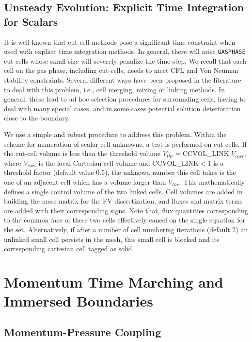 \subsection{Unsteady Evolution: Explicit Time Integration for Scalars} \label{sec:exscl}

It is well known that cut-cell methods pose a significant time constraint when used with explicit time integration methods.
In general, there will arise \texttt{GASPHASE} cut-cells whose small-size will severely penalize
the time step. We recall that each cell on the gas phase, including cut-cells, needs to meet CFL and Von Neuman stability constraints. Several different ways have been proposed in the literature to deal with this problem, i.e., cell merging, mixing or linking methods. In general, these lead to ad hoc selection procedures for surrounding cells, having to deal with many special cases, and in some cases potential solution deterioration close to the boundary.

We use a simple and robust procedure to address this problem. Within the scheme for numeration of scalar cell unknowns, a test is performed on cut-cells. If the cut-cell volume is less than the threshold volume $V_{thr}= ${\ct CCVOL\_LINK} $V_{cart}$, where $V_{cart}$ is the local Cartesian cell volume and {\ct CCVOL\_LINK}$<1$ is a threshold factor (default value 0.5), the unknown number this cell takes is the one of an adjacent cell which has a volume larger than $V_{thr}$. This mathematically defines a single control volume of the two linked cells. Cell volumes are added in building the mass matrix for the FV discretization, and fluxes and matrix terms are added with their corresponding signs. Note that, flux quantities corresponding to the common face of these two cells effectively cancel on the single equation for the set.
Alternatively, if after a number of cell numbering iterations (default 2) an unlinked small cell persists in the mesh, this small cell is blocked and its corresponding cartesian cell tagged as solid. %

\section{Momentum Time Marching and Immersed Boundaries}

\subsection{Momentum-Pressure Coupling}

